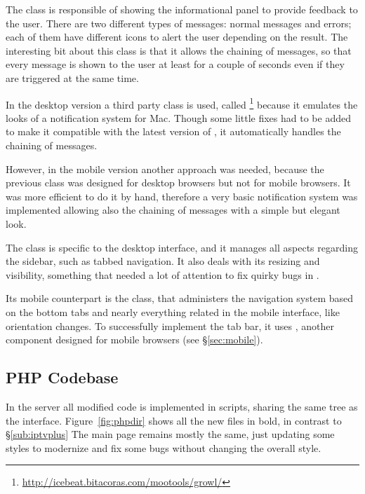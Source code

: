 The  class is responsible of showing the informational panel to provide feedback to the user.
There are two different types of messages: normal messages and errors; each of them have different icons to alert the user depending on the result.
The interesting bit about this class is that it allows the chaining of messages, so that every message is shown to the user at least for a couple of seconds even if they are triggered at the same time.

In the desktop version a third party  class is used, called \footnote{\url{http://icebeat.bitacoras.com/mootools/growl/}} because it emulates the looks of a notification system for Mac.
Though some little fixes had to be added to make it compatible with the latest version of , it automatically handles the chaining of messages.

However, in the mobile version another approach was needed, because the previous class was designed for desktop browsers but not for mobile browsers.
It was more efficient to do it by hand, therefore a very basic notification system was implemented allowing also the chaining of messages with a simple but elegant look.

The  class is specific to the desktop interface, and it manages all aspects regarding the sidebar, such as tabbed navigation.
It also deals with its resizing and visibility, something that needed a lot of attention to fix quirky bugs in .

Its mobile counterpart is the  class, that administers the navigation system based on the bottom tabs and nearly everything related in the mobile interface, like orientation changes.
To successfully implement the tab bar, it uses , another  component designed for  mobile browsers (see \S\vref{sec:mobile}).

\subsection{PHP Codebase} %
\label{sub:php_codebase}

In the server all modified code is implemented in  scripts, sharing the same tree as the  interface.
Figure~\vref{fig:phpdir} shows all the new files in bold, in contrast to \S\vref{sub:iptvplus}
The main page remains mostly the same, just updating some styles to modernize and fix some bugs without changing the overall style.

